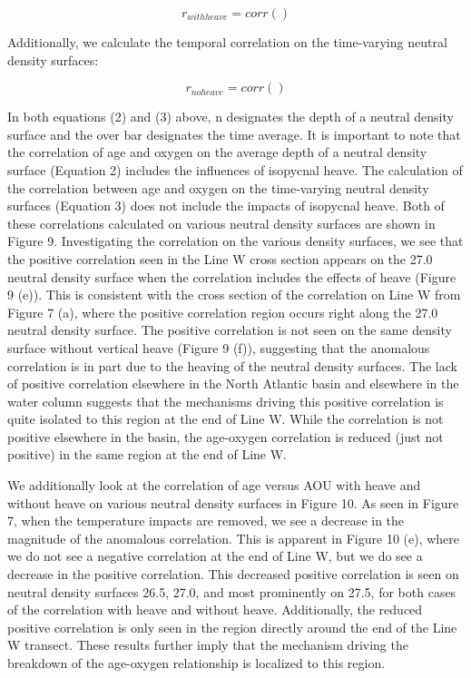 \documentclass{ametsoc}
\begin{document}
\begin{equation}
  r_{with heave} = corr()
\end{equation}

Additionally, we calculate the temporal correlation on the time-varying neutral density surfaces:

\begin{equation}
  r_{no heave} = corr()
\end{equation}

In both equations (2) and (3) above, n  designates the depth of a neutral density surface and the over bar designates the time average. It is important to note that the correlation of age and oxygen on the average depth of a neutral density surface (Equation 2) includes the influences of isopycnal heave. The calculation of the correlation between age and oxygen on the time-varying neutral density surfaces (Equation 3) does not include the impacts of isopycnal heave. Both of these correlations calculated on various neutral density surfaces are shown in Figure 9.  Investigating the correlation on the various density surfaces, we see that the positive correlation seen in the Line W cross section appears on the 27.0 neutral density surface when the correlation includes the effects of heave (Figure 9 (e)). This is consistent with the cross section of the correlation on Line W from Figure 7 (a), where the positive correlation region occurs right along the 27.0 neutral density surface. The positive correlation is not seen on the same density surface without vertical heave (Figure 9 (f)), suggesting that the anomalous correlation is in part due to the heaving of the neutral density surfaces. The lack of positive correlation elsewhere in the North Atlantic basin and elsewhere in the water column suggests that the mechanisms driving this positive correlation is quite isolated to this region at the end of Line W. While the correlation is not positive elsewhere in the basin, the age-oxygen correlation is reduced (just not positive) in the same region at the end of Line W.

We additionally look at the correlation of age versus AOU with heave and without heave on various neutral density surfaces in Figure 10. As seen in Figure 7, when the temperature impacts are removed, we see a decrease in the magnitude of the anomalous correlation. This is apparent in Figure 10 (e), where we do not see a negative correlation at the end of Line W, but we do see a decrease in the positive correlation. This decreased positive correlation is seen on neutral density surfaces 26.5, 27.0, and most prominently on 27.5, for both cases of the correlation with heave and without heave. Additionally, the reduced positive correlation is only seen in the region directly around the end of the Line W transect. These results further imply that the mechanism driving the breakdown of the age-oxygen relationship is localized to this region.
\end{document}
